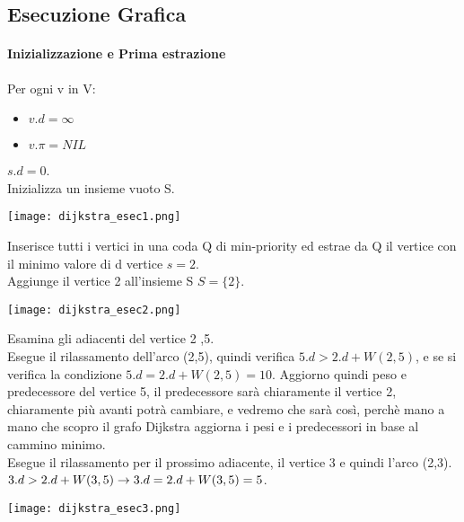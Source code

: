 \subsection{Esecuzione Grafica}
\paragraph*{Inizializzazione e Prima estrazione}
Per ogni v in V:
\begin{itemize}
    \item $v.d = \infty$
    \item $v.\pi = NIL$
\end{itemize}
$s.d = 0$.\\
Inizializza un insieme vuoto S.
\begin{center}
    \texttt{[image: dijkstra\_esec1.png]}
\end{center}
Inserisce tutti i vertici in una coda Q di min-priority ed estrae da Q il vertice con il 
minimo valore di d \ra vertice $s = 2$.\\
Aggiunge il vertice 2 all'insieme S \ra $S=\{2\}$.
\begin{center}
    \texttt{[image: dijkstra\_esec2.png]}
\end{center}
Esamina gli adiacenti del vertice 2 ,5.\\
Esegue il rilassamento dell'arco (2,5), quindi verifica $5.d > 2.d + W(2,5)$,
 e se si verifica la condizione \ra $5.d = 2.d + W(2,5) = 10$. Aggiorno quindi peso e predecessore
del vertice 5, il predecessore sarà chiaramente il vertice 2, chiaramente più avanti potrà cambiare, e
vedremo che sarà così, perchè mano a mano che scopro il grafo Dijkstra aggiorna i pesi e i predecessori in base
al cammino minimo.\\
Esegue il rilassamento per il prossimo adiacente, il vertice 3 e quindi l'arco (2,3).\\
$3.d > 2.d + W(3,5) \rightarrow 3.d = 2.d + W(3,5) = 5$.
\begin{center}
    \texttt{[image: dijkstra\_esec3.png]}
\end{center}
